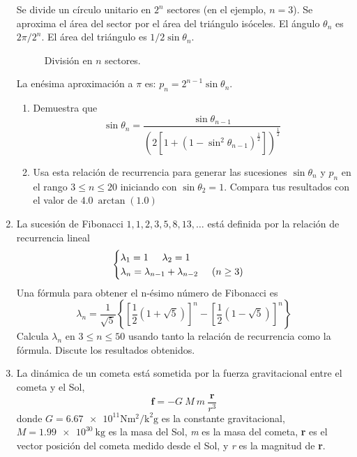 \begin{enumerate}
\par
Se divide un círculo unitario en $2^{n}$ sectores (en el ejemplo, $n=3$). Se aproxima el área del sector por el área del triángulo isóceles. El ángulo $\theta_{n}$ es $2 \pi / 2^{n}$. El área del triángulo es $1/2 \sin \theta_{n}$.
\\
\begin{figure}[H]
\centering

\caption{División en $n$ sectores.}
\end{figure}
La enésima aproximación a $\pi$ es: $p_{n}= 2^{n-1} \sin \theta_{n}$.
\begin{enumerate}
\item Demuestra que
\[\sin \theta_{n} = \dfrac{\sin \theta_{n - 1}}{\left( 2 \left[ 1 + (1 - \sin^{2}\theta_{n - 1})^{\frac{1}{2}} \right] \right)^{\frac{1}{2}}} \]
\item Usa esta relación de recurrencia para generar las sucesiones $\sin \theta_{n}$ y $p_{n}$ en el rango $3 \leq n \leq 20$ iniciando con $\sin \theta_{2} = 1$. Compara tus resultados con el valor de $4.0 \: \arctan(1.0)$
\end{enumerate}
\item La sucesión de Fibonacci $1, 1, 2, 3, 5, 8, 13,\ldots$ está definida por la relación de recurrencia lineal
\begin{equation*}
\begin{cases}
\lambda_{1} = 1 \hspace{0.5cm} \lambda_{2}= 1 \\
\lambda_{n} = \lambda_{n - 1} + \lambda_{n - 2} \hspace{0.5cm} (n \geq 3)
\end{cases}
\end{equation*}
Una fórmula para obtener el n-ésimo número de Fibonacci es
\[ \lambda_{n} = \dfrac{1}{\sqrt{5}} \left\lbrace \left[ \dfrac{1}{2} (1 + \sqrt{5}) \right]^{n} - \left[ \dfrac{1}{2} (1 - \sqrt{5}) \right]^{n} \right\rbrace \]
Calcula $\lambda_{n}$ en $3\leq n \leq 50$ usando tanto la relación de recurrencia como la fórmula. Discute los resultados obtenidos.
\item La dinámica de un cometa está sometida por la fuerza gravitacional entre el cometa y el Sol, 
\[ \textbf{f} = -G \: M \: m \:  \dfrac{\textbf{r}}{r^{3}} \]
donde $ G= \num{6.67e11} \si{\newton\square\meter\per\square\kilo\gram}$ es la constante gravitacional, $M = \SI{1.99e30}{\kilo\gram}$ es la masa del Sol, \textit{m} es la masa del cometa, \textbf{r} es el vector posición del cometa medido desde el Sol, y \textit{r} es la magnitud de \textbf{r}.

\end{enumerate}
